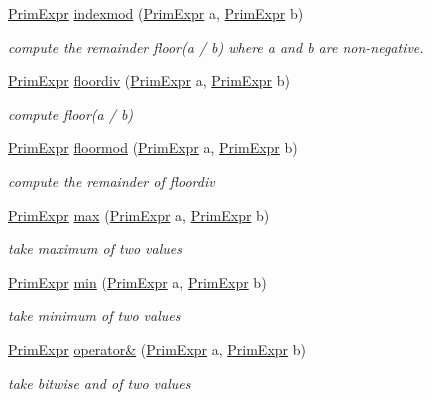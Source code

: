 \begin{DoxyCompactItemize}
\hyperlink{classtvm_1_1PrimExpr}{Prim\+Expr} \hyperlink{namespacetvm_a857781b7243b2f90018f7fe6baf9c30e}{indexmod} (\hyperlink{classtvm_1_1PrimExpr}{Prim\+Expr} a, \hyperlink{classtvm_1_1PrimExpr}{Prim\+Expr} b)
\begin{DoxyCompactList}\small\item\em compute the remainder floor(a / b) where a and b are non-\/negative. \end{DoxyCompactList}\item 
\hyperlink{classtvm_1_1PrimExpr}{Prim\+Expr} \hyperlink{namespacetvm_a25cb3bf64427a16a93529d0a5c40b6de}{floordiv} (\hyperlink{classtvm_1_1PrimExpr}{Prim\+Expr} a, \hyperlink{classtvm_1_1PrimExpr}{Prim\+Expr} b)
\begin{DoxyCompactList}\small\item\em compute floor(a / b) \end{DoxyCompactList}\item 
\hyperlink{classtvm_1_1PrimExpr}{Prim\+Expr} \hyperlink{namespacetvm_a74b2e0fb912a82f974e2b652f7de8d34}{floormod} (\hyperlink{classtvm_1_1PrimExpr}{Prim\+Expr} a, \hyperlink{classtvm_1_1PrimExpr}{Prim\+Expr} b)
\begin{DoxyCompactList}\small\item\em compute the remainder of floordiv \end{DoxyCompactList}\item 
\hyperlink{classtvm_1_1PrimExpr}{Prim\+Expr} \hyperlink{namespacetvm_ab49bad0808ba033343e72ba37b39af2e}{max} (\hyperlink{classtvm_1_1PrimExpr}{Prim\+Expr} a, \hyperlink{classtvm_1_1PrimExpr}{Prim\+Expr} b)
\begin{DoxyCompactList}\small\item\em take maximum of two values \end{DoxyCompactList}\item 
\hyperlink{classtvm_1_1PrimExpr}{Prim\+Expr} \hyperlink{namespacetvm_a9da780393e228969f77aa7550520a582}{min} (\hyperlink{classtvm_1_1PrimExpr}{Prim\+Expr} a, \hyperlink{classtvm_1_1PrimExpr}{Prim\+Expr} b)
\begin{DoxyCompactList}\small\item\em take minimum of two values \end{DoxyCompactList}\item 
\hyperlink{classtvm_1_1PrimExpr}{Prim\+Expr} \hyperlink{namespacetvm_a92e2cae35b1e48f130b76f42c6ee3106}{operator\&} (\hyperlink{classtvm_1_1PrimExpr}{Prim\+Expr} a, \hyperlink{classtvm_1_1PrimExpr}{Prim\+Expr} b)
\begin{DoxyCompactList}\small\item\em take bitwise and of two values \end{DoxyCompactList}\item 

\end{DoxyCompactItemize}
